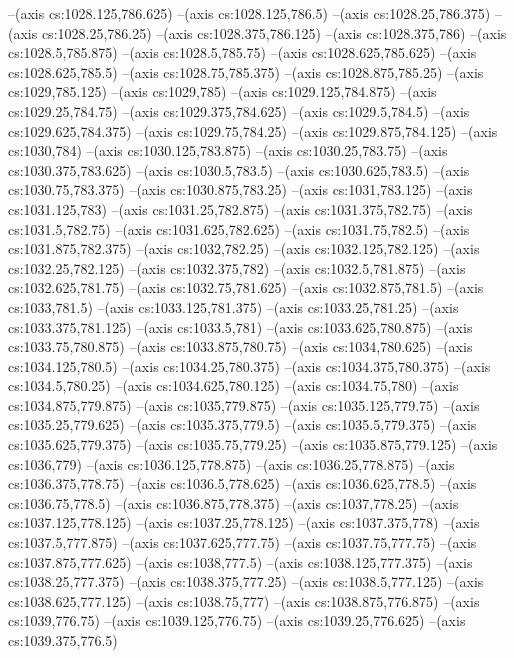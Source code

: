 --(axis cs:1028.125,786.625)
--(axis cs:1028.125,786.5)
--(axis cs:1028.25,786.375)
--(axis cs:1028.25,786.25)
--(axis cs:1028.375,786.125)
--(axis cs:1028.375,786)
--(axis cs:1028.5,785.875)
--(axis cs:1028.5,785.75)
--(axis cs:1028.625,785.625)
--(axis cs:1028.625,785.5)
--(axis cs:1028.75,785.375)
--(axis cs:1028.875,785.25)
--(axis cs:1029,785.125)
--(axis cs:1029,785)
--(axis cs:1029.125,784.875)
--(axis cs:1029.25,784.75)
--(axis cs:1029.375,784.625)
--(axis cs:1029.5,784.5)
--(axis cs:1029.625,784.375)
--(axis cs:1029.75,784.25)
--(axis cs:1029.875,784.125)
--(axis cs:1030,784)
--(axis cs:1030.125,783.875)
--(axis cs:1030.25,783.75)
--(axis cs:1030.375,783.625)
--(axis cs:1030.5,783.5)
--(axis cs:1030.625,783.5)
--(axis cs:1030.75,783.375)
--(axis cs:1030.875,783.25)
--(axis cs:1031,783.125)
--(axis cs:1031.125,783)
--(axis cs:1031.25,782.875)
--(axis cs:1031.375,782.75)
--(axis cs:1031.5,782.75)
--(axis cs:1031.625,782.625)
--(axis cs:1031.75,782.5)
--(axis cs:1031.875,782.375)
--(axis cs:1032,782.25)
--(axis cs:1032.125,782.125)
--(axis cs:1032.25,782.125)
--(axis cs:1032.375,782)
--(axis cs:1032.5,781.875)
--(axis cs:1032.625,781.75)
--(axis cs:1032.75,781.625)
--(axis cs:1032.875,781.5)
--(axis cs:1033,781.5)
--(axis cs:1033.125,781.375)
--(axis cs:1033.25,781.25)
--(axis cs:1033.375,781.125)
--(axis cs:1033.5,781)
--(axis cs:1033.625,780.875)
--(axis cs:1033.75,780.875)
--(axis cs:1033.875,780.75)
--(axis cs:1034,780.625)
--(axis cs:1034.125,780.5)
--(axis cs:1034.25,780.375)
--(axis cs:1034.375,780.375)
--(axis cs:1034.5,780.25)
--(axis cs:1034.625,780.125)
--(axis cs:1034.75,780)
--(axis cs:1034.875,779.875)
--(axis cs:1035,779.875)
--(axis cs:1035.125,779.75)
--(axis cs:1035.25,779.625)
--(axis cs:1035.375,779.5)
--(axis cs:1035.5,779.375)
--(axis cs:1035.625,779.375)
--(axis cs:1035.75,779.25)
--(axis cs:1035.875,779.125)
--(axis cs:1036,779)
--(axis cs:1036.125,778.875)
--(axis cs:1036.25,778.875)
--(axis cs:1036.375,778.75)
--(axis cs:1036.5,778.625)
--(axis cs:1036.625,778.5)
--(axis cs:1036.75,778.5)
--(axis cs:1036.875,778.375)
--(axis cs:1037,778.25)
--(axis cs:1037.125,778.125)
--(axis cs:1037.25,778.125)
--(axis cs:1037.375,778)
--(axis cs:1037.5,777.875)
--(axis cs:1037.625,777.75)
--(axis cs:1037.75,777.75)
--(axis cs:1037.875,777.625)
--(axis cs:1038,777.5)
--(axis cs:1038.125,777.375)
--(axis cs:1038.25,777.375)
--(axis cs:1038.375,777.25)
--(axis cs:1038.5,777.125)
--(axis cs:1038.625,777.125)
--(axis cs:1038.75,777)
--(axis cs:1038.875,776.875)
--(axis cs:1039,776.75)
--(axis cs:1039.125,776.75)
--(axis cs:1039.25,776.625)
--(axis cs:1039.375,776.5)
